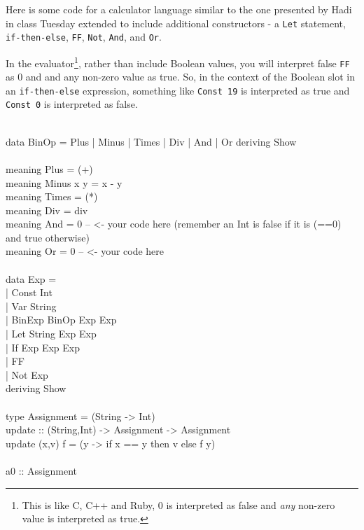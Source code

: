 \documentclass[11pt]{article}
\begin{document}

Here is some code for a calculator language similar to the one presented by
Hadi in class Tuesday extended to include additional constructors - a {\tt{Let}} statement,
{\tt{if-then-else}}, {\tt{FF}}, {\tt{Not}}, {\tt{And}}, and {\tt{Or}}.  


In the evaluator\footnote{This is like C, C++ and Ruby, 0 is interpreted as
false and {\em{any}} non-zero value is interpreted as true.}, rather than
include Boolean values, you will interpret false {\tt{FF}} as 0 and and any
non-zero value as true.  So, in the context of the Boolean slot in an
{\tt{if-then-else}} expression, something like {\tt{Const 19}} is interpreted as
true and {\tt{Const 0}} is interpreted as false.  


\begin{program*}
\>   \\
\> data BinOp = Plus | Minus | Times | Div | And | Or  deriving Show  \\
\>   \\
\> meaning Plus = (+)  \\
\> meaning Minus x y =  x - y  \\
\> meaning Times = (*)  \\
\> meaning Div = div  \\
\> meaning And = 0 -- <- your code here (remember an Int is false if it is (==0) and true otherwise)  \\
\> meaning Or = 0 -- <- your code here  \\
\>   \\
\> data Exp = \\
\>     | Const Int   \\
\>     | Var String   \\
\>     | BinExp BinOp Exp Exp   \\
\>     | Let String Exp Exp   \\
\>     | If Exp Exp Exp   \\
\>     | FF   \\
\>     | Not Exp   \\ 
\>       deriving Show   \\ 
\>   \\
\> type Assignment = (String -> Int)  \\
\> update :: (String,Int) -> Assignment -> Assignment  \\
\> update (x,v) f = (y -> if x == y then v else f y)  \\
\>   \\
\> a0 :: Assignment  \\

\end{program*}
\end{document}
